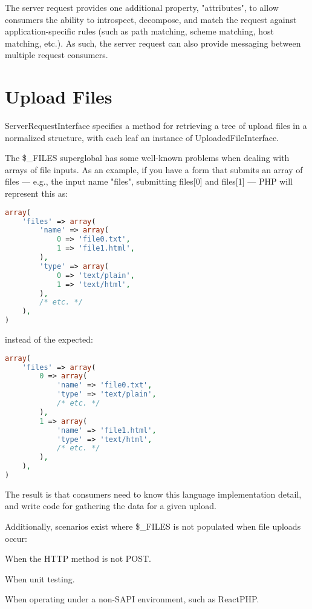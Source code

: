 The server request provides one additional property, "attributes", to allow consumers the ability to introspect, decompose, and match the request against application-specific rules (such as path matching, scheme matching, host matching, etc.). As such, the server request can also provide messaging between multiple request consumers.


\section{Upload Files}

ServerRequestInterface specifies a method for retrieving a tree of upload files in a normalized structure, with each leaf an instance of UploadedFileInterface.

The \$\_FILES superglobal has some well-known problems when dealing with arrays of file inputs. As an example, if you have a form that submits an array of files — e.g., the input name "files", submitting files[0] and files[1] — PHP will represent this as:


\begin{lstlisting}[language=PHP]
array(
    'files' => array(
        'name' => array(
            0 => 'file0.txt',
            1 => 'file1.html',
        ),
        'type' => array(
            0 => 'text/plain',
            1 => 'text/html',
        ),
        /* etc. */
    ),
)
\end{lstlisting}

instead of the expected:

\begin{lstlisting}[language=PHP]
array(
    'files' => array(
        0 => array(
            'name' => 'file0.txt',
            'type' => 'text/plain',
            /* etc. */
        ),
        1 => array(
            'name' => 'file1.html',
            'type' => 'text/html',
            /* etc. */
        ),
    ),
)
\end{lstlisting}

The result is that consumers need to know this language implementation detail, and write code for gathering the data for a given upload.

Additionally, scenarios exist where \$\_FILES is not populated when file uploads occur:

\begin{compactitem}
\item When the HTTP method is not POST.
\item When unit testing.
\item When operating under a non-SAPI environment, such as ReactPHP.
\end{compactitem}


